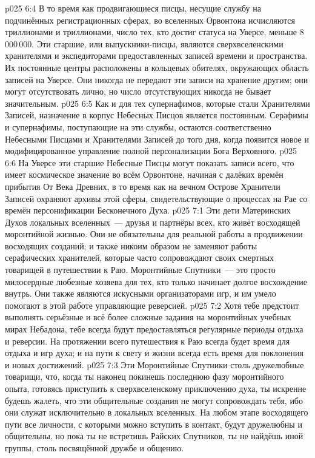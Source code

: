 \vs p025 6:4 В то время как продвигающиеся писцы, несущие службу на подчинённых регистрационных сферах, во вселенных Орвонтона исчисляются триллионами и триллионами, число тех, кто достиг статуса на Уверсе, меньше 8\,000\,000. Эти старшие, или выпускники\hyp{}писцы, являются сверхвселенскими хранителями и экспедиторами предоставленных записей времени и пространства. Их постоянные центры расположены в кольцевых обителях, окружающих область записей на Уверсе. Они никогда не передают эти записи на хранение другим; они могут отсутствовать лично, но число отсутствующих никогда не бывает значительным.
\vs p025 6:5 Как и для тех супернафимов, которые стали Хранителями Записей, назначение в корпус Небесных Писцов является постоянным. Серафимы и супернафимы, поступающие на эти службы, остаются соответственно Небесными Писцами и Хранителями Записей до того дня, когда появится новое и модифицированное управление полной персонализации Бога Верховного.
\vs p025 6:6 На Уверсе эти старшие Небесные Писцы могут показать записи всего, что имеет космическое значение во всём Орвонтоне, начиная с далёких времён прибытия От Века Древних, в то время как на вечном Острове Хранители Записей охраняют архивы этой сферы, свидетельствующие о процессах на Рае со времён персонификации Бесконечного Духа.
\vs p025 7:1 Эти дети Материнских Духов локальных вселенных~--- друзья и партнёры всех, кто живёт восходящей моронтийной жизнью. Они не обязательны для реальной работы в продвижении восходящих созданий; и также никоим образом не заменяют работы серафических хранителей, которые часто сопровождают своих смертных товарищей в путешествии к Раю. Моронтийные Спутники~--- это просто милосердные любезные хозяева для тех, кто только начинает долгое восхождение внутрь. Они также являются искусными организаторами игр, и им умело помогают в этой работе управляющие реверсией.
\vs p025 7:2 Хотя тебе предстоит выполнять серьёзные и всё более сложные задания на моронтийных учебных мирах Небадона, тебе всегда будут предоставляться регулярные периоды отдыха и реверсии. На протяжении всего путешествия к Раю всегда будет время для отдыха и игр духа; и на пути к свету и жизни всегда есть время для поклонения и новых достижений.
\vs p025 7:3 Эти Моронтийные Спутники столь дружелюбные товарищи, что, когда ты наконец покинешь последнюю фазу моронтийного опыта, готовясь приступить к сверхвселенскому приключению духа, ты искренне будешь жалеть, что эти общительные создания не могут сопровождать тебя, ибо они служат исключительно в локальных вселенных. На любом этапе восходящего пути все личности, с которыми можно вступить в контакт, будут дружелюбны и общительны, но пока ты не встретишь Райских Спутников, ты не найдёшь иной группы, столь посвящённой дружбе и общению.
